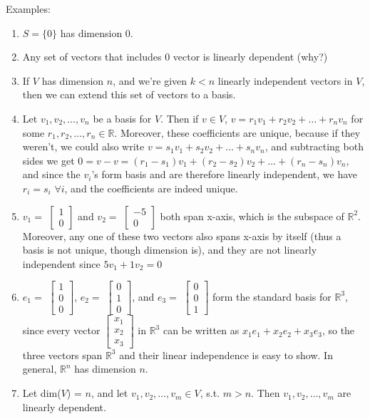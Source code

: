 \documentclass[12pt,oneside]{article}
\begin{document}
\noindent Examples:
\begin{enumerate}
\item $S =\{0\}$ has dimension 0.
\item Any set of vectors that includes $0$ vector is linearly
  dependent (why?)
\item If $V$ has dimension $n$, and we're given $k < n$ linearly
  independent vectors in $V$, then we can extend this set of vectors
  to a basis.
\item Let $v_1, v_2, \ldots, v_n$ be a basis for $V$. Then if $v \in
  V$, $v = r_1 v_1 + r_2 v_2 + \ldots + r_n v_n$ for some $r_1, r_2,
  \ldots, r_n \in \mathbb{R}$. Moreover, these coefficients are
  unique, because if they weren't, we could also write $v = s_1 v_1 + s_2
  v_2 + \ldots + s_n v_n$, and subtracting both sides we get $0 = v-v
  = (r_1 - s_1) v_1 + (r_2 - s_2) v_2 + \ldots + (r_n - s_n) v_n$, and
  since the $v_i$'s form basis and are therefore linearly independent,
  we have $r_i = s_i$ $\forall i$, and the coefficients are indeed unique.
\item $v_{1} = $ $\left[ \begin{array} {c} 1 \\ 0 \end{array} \right]$ and
  $v_{2} =$ $\left[ \begin{array} {c} -5 \\ 0 \end{array} \right]$ both span
  x-axis, which is the subspace of ${\mathbb{R}}^{2}$. Moreover, any
  one of these two vectors also spans x-axis by itself (thus a
  basis is not unique, though dimension is), and they
  are not linearly independent since $5 v_{1} + 1 v_{2} = 0$
\item $e_{1} =$ $\left[ \begin{array} {c} 1 \\ 0 \\ 0 \end{array}
  \right]$, $e_{2} =$ $\left[ \begin{array} {c} 0 \\ 1 \\ 0
  \end{array} \right]$, and $e_{3} =$ $\left[ \begin{array} {c} 0 \\ 0
  \\ 1 \end{array} \right]$ form the standard basis for ${\mathbb{R}^3}$,
  since every vector $\left[ \begin{array} {c} x_{1} \\ x_{2} \\ x_{3}
  \end{array} \right]$ in ${\mathbb{R}}^{3}$ can be written as $x_{1}
  e_{1} + x_{2} e_{2} + x_{3} e_{3}$, so the three vectors span
  ${\mathbb{R}}^{3}$ and their linear independence is easy to show. In
  general, ${\mathbb{R}}^{n}$ has dimension $n$.
\item Let dim($V$) = $n$, and let $v_{1}, v_{2}, \ldots, v_{m} \in V$,
  s.t. $m > n$. Then $v_{1}, v_{2}, \ldots, v_{m}$ are linearly
  dependent.
\end{enumerate}
\end{document}
